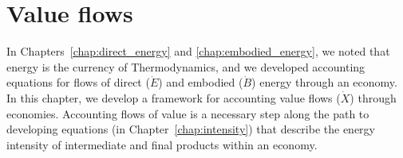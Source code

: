 %
%
%

\chapter{Value flows}
\label{chap:value} %








In Chapters~\ref{chap:direct_energy} and \ref{chap:embodied_energy}, 
we noted that energy is the currency of Thermodynamics,
and we developed accounting equations for flows of 
direct ($\dot{E}$) and embodied ($\dot{B}$) energy through an economy.
In this chapter, we develop a framework for accounting
value flows ($\dot{X}$) through economies.
Accounting flows of value is a necessary step along
the path to developing equations (in Chapter~\ref{chap:intensity}) 
that describe the energy intensity of intermediate
and final products within an economy.


